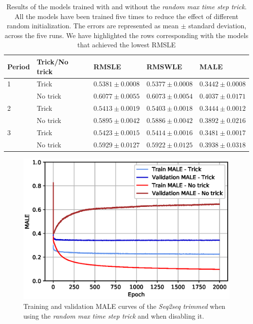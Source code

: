 \documentclass{elsarticle}
\begin{document}
		\begin{table}[!h]
		\footnotesize
		\caption{Results of the models trained with and without the \textit{random max time step trick}. All the models have been trained five times to reduce the effect of different random initialization. The errors are represented as mean $\pm$ standard deviation, across the five runs. We have highlighted the rows corresponding with the models that achieved the lowest RMSLE}
		\label{tab:results_notrick}
		\centering
		\begin{tabular}{lllll}
			\hline
			Period & Trick/No trick             & RMSLE                 & RMSWLE                & MALE                  \\ \hline
			1 & Trick   & $ \mathbf{0.5381 \pm 0.0008} $ & $ \mathbf{0.5377 \pm 0.0008} $ & $ \mathbf{0.3442 \pm 0.0008} $ \\
			& No trick & $ 0.6077 \pm 0.0055 $  &  $ 0.6073 \pm 0.0054 $  &  $ 0.4037 \pm 0.0171 $ \\
			\hline
			2 & Trick  & $ \mathbf{0.5413 \pm 0.0019} $ & $ \mathbf{0.5403 \pm 0.0018} $ & $ \mathbf{0.3444 \pm 0.0012} $ \\
			& No trick & $ 0.5895 \pm 0.0042 $  &  $ 0.5886 \pm 0.0042 $  &  $ 0.3892 \pm 0.0216 $ \\
			\hline
			3 & Trick  & $ \mathbf{0.5423 \pm 0.0015} $ & $ \mathbf{0.5414 \pm 0.0016} $ & $ \mathbf{0.3481 \pm 0.0017} $ \\
			& No trick & $ 0.5929 \pm 0.0127 $  &  $ 0.5922 \pm 0.0125 $  &  $ 0.3938 \pm 0.0318 $ \\
			\hline
		\end{tabular}
	\end{table}

	\begin{figure}[h!]
		\centering
		\includegraphics[width=0.7\linewidth]{img/train_curves_notrick}
		\caption{Training and validation MALE curves of the \textit{Seq2seq trimmed} when using the \textit{random max time step trick} and when disabling it.}
		\label{fig:traincurvesnotrick}
	\end{figure}
	
\end{document}
